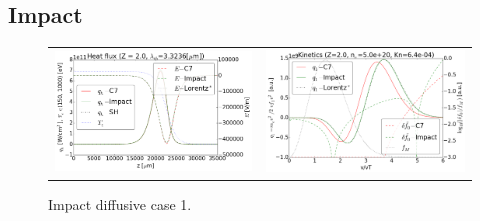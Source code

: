 \subsection{Impact}
\label{sec:Impactcode}

\begin{figure}[tbh]
  \begin{center}
    \begin{tabular}{cc}
      \includegraphics[width=\figscale\textwidth]{../VFPdata/C7_Impact_case1_heatflux.png} &
      \includegraphics[width=\figscale\textwidth]{../VFPdata/C7_Impact_case1_kinetics.png}
    \end{tabular}
  \caption{  
  Impact diffusive case 1.}
  \end{center}
  \label{fig:C7_Impact_case1}
\end{figure}

